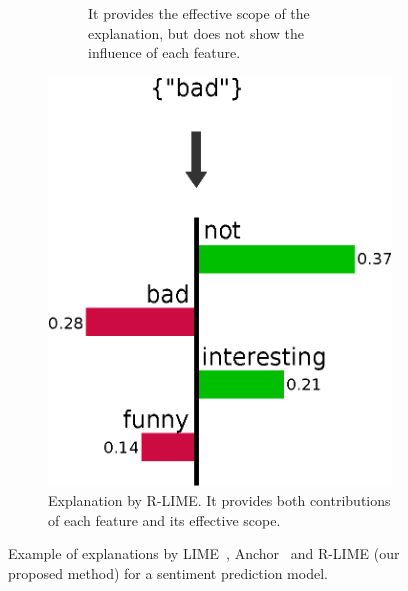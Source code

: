 \documentclass[runningheads]{llncs}
\begin{document}
\begin{figure}[tbp]
\begin{subfigure}[t]{0.45\textwidth}
\begin{subfigure}[t]{\textwidth}
{        It provides the effective scope of the explanation,
        but does not show the influence of each feature.
      }\label{fig:example-anchor}
    \end{subfigure}
  \end{subfigure}
  \hspace{0.3cm}
  \begin{subfigure}[t]{0.45\textwidth}
    \centering
    \vspace{-2.24cm}
    \includegraphics[scale=\scale]{example-rlime}
    \caption{%
      Explanation by R-LIME\@.
      It provides both contributions of each feature and
      its effective scope.
    }\label{fig:example-rlime}
  \end{subfigure}
  \caption[Example of explanations by LIME, Anchor and R-LIME]{%
    Example of explanations by LIME~\cite{ribeiro2016why},
    Anchor~\cite{ribeiro2018anchors} and R-LIME (our proposed method)
    for a sentiment prediction model.
  }\label{fig:example}
\end{figure}
\end{document}
